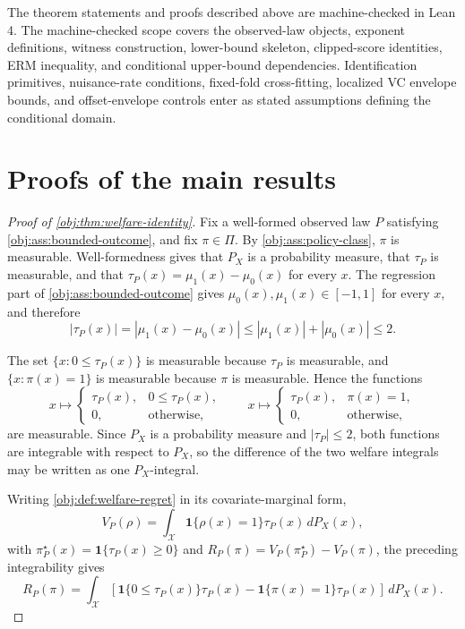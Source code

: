\documentclass[11pt]{article}
\begin{document}
The theorem statements and proofs described above are machine-checked in Lean 4.  The machine-checked scope covers the observed-law objects, exponent definitions, witness construction, lower-bound skeleton, clipped-score identities, ERM inequality, and conditional upper-bound dependencies.  Identification primitives, nuisance-rate conditions, fixed-fold cross-fitting, localized VC envelope bounds, and offset-envelope controls enter as stated assumptions defining the conditional domain.


\section{Proofs of the main results}\label{sec:deferred-proofs}

\begin{proof}[Proof of \cref{obj:thm:welfare-identity}]
Fix a well-formed observed law \(P\) satisfying \cref{obj:ass:bounded-outcome}, and fix \(\pi\in\Pi\).  By \cref{obj:ass:policy-class}, \(\pi\) is measurable.  Well-formedness gives that \(P_X\) is a probability measure, that \(\tau_P\) is measurable, and that
\(\tau_P(x)=\mu_1(x)-\mu_0(x)\) for every \(x\).  The regression part of \cref{obj:ass:bounded-outcome} gives
\(\mu_0(x),\mu_1(x)\in[-1,1]\) for every \(x\), and therefore
\[
|\tau_P(x)|
=
|\mu_1(x)-\mu_0(x)|
\le |\mu_1(x)|+|\mu_0(x)|
\le 2 .
\]

The set \(\{x:0\le\tau_P(x)\}\) is measurable because \(\tau_P\) is measurable, and \(\{x:\pi(x)=1\}\) is measurable because \(\pi\) is measurable.  Hence the functions
\[
x\mapsto
\begin{cases}
\tau_P(x),&0\le \tau_P(x),\\
0,&\text{otherwise},
\end{cases}
\qquad
x\mapsto
\begin{cases}
\tau_P(x),&\pi(x)=1,\\
0,&\text{otherwise},
\end{cases}
\]
are measurable.  Since \(P_X\) is a probability measure and \(|\tau_P|\le2\), both functions are integrable with respect to \(P_X\), so the difference of the two welfare integrals may be written as one \(P_X\)-integral.

Writing \cref{obj:def:welfare-regret} in its covariate-marginal form,
\[
V_P(\rho)=\int_{\mathcal X}\mathbf 1\{\rho(x)=1\}\tau_P(x)\,dP_X(x),
\]
with \(\pi^\star_P(x)=\mathbf 1\{\tau_P(x)\ge0\}\) and \(R_P(\pi)=V_P(\pi^\star_P)-V_P(\pi)\), the preceding integrability gives
\[
R_P(\pi)
=
\int_{\mathcal X}
\left[
\mathbf 1\{0\le\tau_P(x)\}\tau_P(x)
-
\mathbf 1\{\pi(x)=1\}\tau_P(x)
\right] \,dP_X(x).
\]


\end{proof}
\end{document}

